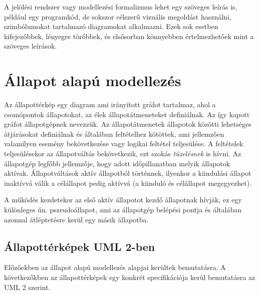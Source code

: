 A jelölési rendszer vagy modellezési formalizmus lehet egy szöveges leírás is, például egy programkód, de sokszor célszerű vizuális megoldást használni, szimbólumokat tartalmazó diagramokat alkalmazni. Ezek sok esetben kifejezőbbek, lényegre törőbbek, és elsősorban könnyebben értelmezhetőek mint a szöveges leírások.

\section{Állapot alapú modellezés}

Az állapottérkép egy diagram ami irányított gráfot tartalmaz, ahol a csomópontok állapotokat, az élek állapotátmeneteket definiálnak. Az így kapott gráfot állapotgépnek nevezzük. Az állapotátmenetek állapotok közötti lehetséges átjárásokat definiálnak és általában feltételhez kötöttek, ami jellemzően valamilyen esemény bekövetkezése vagy logikai feltétel teljesülése. A feltételek teljesülésekor az állapotváltás bekövetkezik, ezt szokás \emph{tüzelésnek} is hívni. Az állapotgép legfőbb jellemzője, hogy adott időpillanatban melyik állapotok aktívak. Állapotváltások aktív állapotból történnek, ilyenkor a kiindulási állapot inaktívvá válik a célállapot pedig aktívvá (a kiinduló és célállapot megegyezhet).

A működés kezdetekor az első aktív állapotot kezdő állapotnak hívják, ez egy különleges ún. pszeudoállapot, ami az állapotgép belépési pontja és általában azonnal átléptetésre kerül egy másik állapotba.

\subsection{Állapottérképek UML 2-ben}
Előzőekben az állapot alapú modellezés alapjai kerültek bemutatásra. A következőkben az állapottérképek egy konkrét specifikációja kerül bemutatásra az UML 2 szerint.

